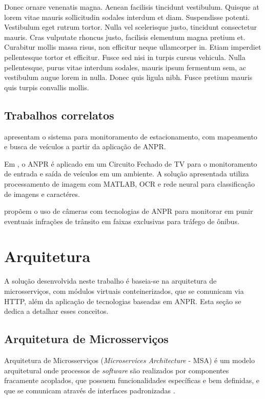 \documentclass[12pt]{article}
\begin{document}
Donec ornare venenatis magna. Aenean facilisis tincidunt vestibulum. Quisque at lorem vitae mauris sollicitudin sodales interdum et diam. Suspendisse potenti. Vestibulum eget rutrum tortor. Nulla vel scelerisque justo, tincidunt consectetur mauris. Cras vulputate rhoncus justo, facilisis elementum magna pretium et. Curabitur mollis massa risus, non efficitur neque ullamcorper in. Etiam imperdiet pellentesque tortor et efficitur. Fusce sed nisi in turpis cursus vehicula. Nulla pellentesque, purus vitae interdum sodales, mauris ipsum fermentum sem, ac vestibulum augue lorem in nulla. Donec quis ligula nibh. Fusce pretium mauris quis turpis convallis mollis. 

\subsection{Trabalhos correlatos}

 apresentam o sistema para monitoramento de estacionamento, com mapeamento e busca de veículos a partir da aplicação de ANPR.

Em , o ANPR é aplicado em um Circuito Fechado de TV para o monitoramento de entrada e saída de veículos em um ambiente. A solução apresentada utiliza processamento de imagem com MATLAB, OCR e rede neural para classificação de imagens e caractéres.

 propõem o uso de câmeras com tecnologias de ANPR para monitorar em punir eventuais infrações de trânsito em faixas exclusivas para tráfego de ônibus.

\section{Arquitetura} \label{sec:architecture}

A solução desenvolvida neste trabalho é baseia-se na arquitetura de microsserviços, com módulos virtuais conteinerizados, que se comunicam via HTTP, além da aplicação de tecnologias baseadas em ANPR. Esta seção se dedica a detalhar esses conceitos.

\subsection{Arquitetura de Microsserviços}

Arquitetura de Microsserviços (\textit{Microservices Architecture} - MSA) é um modelo arquitetural onde processos de \textit{software} são realizados por componentes fracamente acoplados, que possuem funcionalidades específicas e bem definidas, e que se comunicam através de interfaces padronizadas \cite{viggiato2018}.
\end{document}
